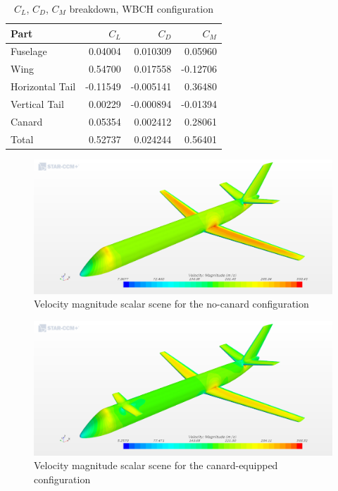 %
\bigskip
\begin{table}[H]
\centering
\begin{tabular}{lrrr}
\toprule
\textbf{Part} & \textbf{$C_{L}$} & \textbf{$C_{D}$} & \textbf{$C_{M}$} \\
\midrule
Fuselage & 0.04004 & 0.010309 & 0.05960 \\
Wing & 0.54700 & 0.017558 & -0.12706 \\
Horizontal Tail & -0.11549 & -0.005141 & 0.36480 \\
Vertical Tail & 0.00229 & -0.000894 & -0.01394 \\
Canard & 0.05354 & 0.002412 & 0.28061 \\ 
\midrule
Total & 0.52737 & 0.024244 & 0.56401 \\
\bottomrule
\end{tabular}
\caption{$C_{L}$,  $C_{D}$, $C_{M}$ breakdown, WBCH configuration}
\label{tab:WBCH_CLCDCM}
\end{table}
%
\begin{figure}[H]
\centering
\includegraphics[scale=0.32]{Immagini/Capitolo4/Test_Sim_01_Scalar_Scene_1}
\caption{Velocity magnitude scalar scene for the no-canard configuration}
\label{fig:VMag_01}
\end{figure} 
%
\begin{figure}[H]
\centering
\includegraphics[scale=0.32]{Immagini/Capitolo4/Test_Sim_02_Scalar_Scene_1}
\caption{Velocity magnitude scalar scene for the canard-equipped configuration}
\label{fig:VMag_02}
\end{figure}  
%

